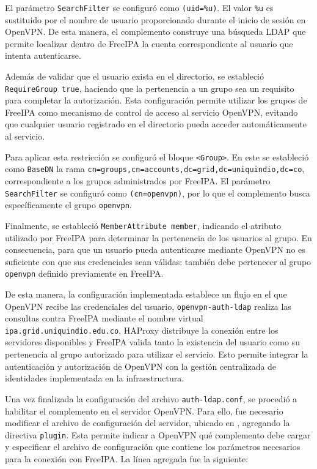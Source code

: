 El parámetro \texttt{SearchFilter} se configuró como \texttt{(uid=\%u)}. El valor \texttt{\%u} es sustituido por el nombre de usuario proporcionado durante el inicio de sesión en OpenVPN. De esta manera, el complemento construye una búsqueda \ac{LDAP} que permite localizar dentro de FreeIPA la cuenta correspondiente al usuario que intenta autenticarse.

Además de validar que el usuario exista en el directorio, se estableció \texttt{RequireGroup true}, haciendo que la pertenencia a un grupo sea un requisito para completar la autorización. Esta configuración permite utilizar los grupos de FreeIPA como mecanismo de control de acceso al servicio OpenVPN, evitando que cualquier usuario registrado en el directorio pueda acceder automáticamente al servicio.

Para aplicar esta restricción se configuró el bloque \texttt{<Group>}. En este se estableció como \texttt{BaseDN} la rama \texttt{cn=groups,cn=accounts,dc=grid,dc=uniquindio,dc=co}, correspondiente a los grupos administrados por FreeIPA. El parámetro \texttt{SearchFilter} se configuró como \texttt{(cn=openvpn)}, por lo que el complemento busca específicamente el grupo \texttt{openvpn}.

Finalmente, se estableció \texttt{MemberAttribute member}, indicando el atributo utilizado por FreeIPA para determinar la pertenencia de los usuarios al grupo. En consecuencia, para que un usuario pueda autenticarse mediante OpenVPN no es suficiente con que sus credenciales sean válidas: también debe pertenecer al grupo \texttt{openvpn} definido previamente en FreeIPA.

De esta manera, la configuración implementada establece un flujo en el que Open\-VPN recibe las credenciales del usuario, \texttt{openvpn-auth-ldap} realiza las consultas contra FreeIPA mediante el nombre virtual \texttt{ipa.grid.uniquindio.edu.co}, HAProxy distribuye la conexión entre los servidores disponibles y FreeIPA valida tanto la existencia del usuario como su pertenencia al grupo autorizado para utilizar el servicio. Esto permite integrar la autenticación y autorización de OpenVPN con la gestión centralizada de identidades implementada en la infraestructura.

Una vez finalizada la configuración del archivo \texttt{auth-ldap.conf}, se procedió a habilitar el complemento en el servidor OpenVPN. Para ello, fue necesario modificar el archivo de configuración del servidor, ubicado en , agregando la directiva \texttt{plugin}. Esta permite indicar a OpenVPN qué complemento debe cargar y especificar el archivo de configuración que contiene los parámetros necesarios para la conexión con FreeIPA. La línea agregada fue la siguiente:

